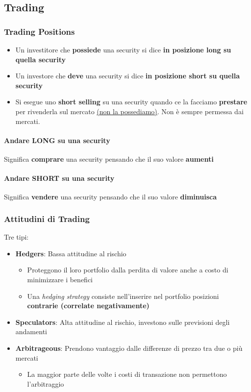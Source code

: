 \documentclass[12pt]{article}
\begin{document}
\subsection{Trading}
\subsubsection{Trading Positions}
\begin{itemize}
    \item Un investitore che \textbf{possiede} una security si dice \textbf{in posizione long su quella security}
    \item Un investore che \textbf{deve} una security si dice \textbf{in posizione short su quella security}
    \item Si esegue uno \textbf{short selling} su una security quando ce la facciamo \textbf{prestare} per rivenderla sul mercato \underline{(non la possediamo)}. Non è sempre permessa dai mercati.
\end{itemize}
\paragraph{Andare LONG su una security} Significa \textbf{comprare} una security pensando che il suo valore \textbf{aumenti}
\paragraph{Andare SHORT su una security} Significa \textbf{vendere} una security pensando che il suo valore \textbf{diminuisca}
\subsubsection{Attitudini di Trading}
Tre tipi:
\begin{itemize}
    \item \textbf{Hedgers}: Bassa attitudine al rischio
          \begin{itemize}
              \item Proteggono il loro portfolio dalla perdita di valore anche a costo di minimizzare i benefici
              \item Una \textit{hedging strategy} consiste nell'inserire nel portfolio posizioni \textbf{contrarie (correlate negativamente)}
          \end{itemize}
    \item \textbf{Speculators}: Alta attitudine al rischio, investono sulle previsioni degli andamenti
    \item \textbf{Arbitrageous}: Prendono vantaggio dalle differenze di prezzo tra due o più mercati
          \begin{itemize}
              \item La maggior parte delle volte i costi di transazione non permettono l'arbitraggio
          \end{itemize}
\end{itemize}
\end{document}
